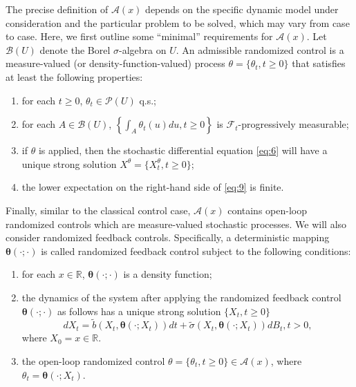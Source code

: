 \documentclass[onecolumn, journal]{IEEEtran} %
\begin{document}
	The precise definition of \(\mathcal{A}(x) \) depends on the specific dynamic model under consideration and the particular problem to be solved, which may vary from case to case. Here, we first outline some ``minimal'' requirements for \(\mathcal{A}(x) \). Let \( \mathcal{B}(U) \) denote the Borel \(\sigma\)-algebra on \( U \). An admissible randomized control is a measure-valued (or density-function-valued) process \( \theta = \{\theta_t, t \geq 0\} \) that satisfies at least the following properties:
	
	\begin{enumerate}
		\item[(i)] for each \( t \geq 0 \), \( \theta_t \in \mathcal{P}(U) \) q.s.;
		
		\item[(ii)] for each \( A \in \mathcal{B}(U) \), \(\left\{ \int_A \theta_t(u)du, t \geq 0 \right\}\) is \( \mathcal{F}_t \)-progressively measurable;
		
		\item[(iii)] if \( \theta \) is applied, then the stochastic differential equation \eqref{eq:6} will have a unique strong solution \( X^\theta = \{X_t^\theta, t \geq 0\} \);
		
		\item[(iv)] the lower expectation on the right-hand side of \eqref{eq:9} is finite.
	\end{enumerate}
	
	Finally, similar to the classical control case,  \(\mathcal{A}(x) \) contains open-loop randomized controls which are measure-valued stochastic processes. We will also consider randomized feedback controls. Specifically, a deterministic mapping \(\boldsymbol{\theta}(\cdot;\cdot)\) is called randomized feedback control subject to the following conditions:
	\begin{enumerate}
		\item[(i)] for each \( x \in \mathbb{R} \),  \(\boldsymbol{\theta}(\cdot;\cdot)\) is a density function;
		
		\item[(ii)] the dynamics of the system after applying the randomized feedback control \(\boldsymbol{\theta}(\cdot;\cdot)\) as follows has a unique strong solution \(\{X_t, t \geq 0\}\)
		\[
		dX_t = \tilde{b}(X_t, \boldsymbol{\theta}(\cdot; X_t))dt + \tilde{\sigma}(X_t, \boldsymbol{\theta}(\cdot; X_t))dB_t, t > 0,
		\]
		where \(X_0 = x \in \mathbb{R}\).
		\item [(iii)] the open-loop randomized control \(\theta = \{\theta_t, t \geq 0\} \in \mathcal{A}(x)\), where \(\theta_t = \boldsymbol{\theta}(\cdot; X_t)\).
	\end{enumerate}
	
\end{document}
